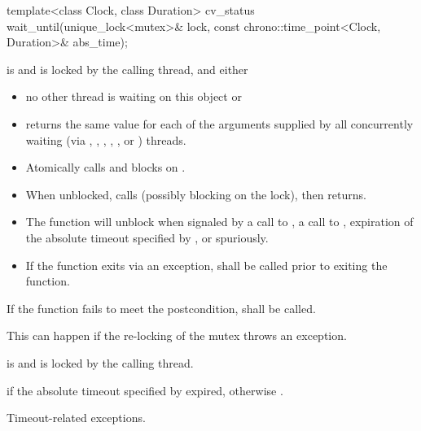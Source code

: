 %
\begin{itemdecl}
template<class Clock, class Duration>
  cv_status wait_until(unique_lock<mutex>& lock,
                       const chrono::time_point<Clock, Duration>& abs_time);
\end{itemdecl}
\begin{itemdescr}
 \pnum \requires {} is  and 
        is locked by the calling thread, and either
        \begin{itemize}
         \item no other thread is waiting on this  object or
         \item {} returns the same value for each of the 
                arguments supplied by all concurrently waiting (via ,
                , ,
                {\color{insertcolor} , , or }) threads.
        \end{itemize}

 \pnum \effects
        \begin{itemize}
         \item Atomically calls  and blocks on .

         \item When unblocked, calls  (possibly blocking on the lock), then returns.

         \item The function will unblock when signaled by a call to , a call to ,
                expiration of the absolute timeout specified by ,
                or spuriously.

         \item If the function exits via an exception,  shall be called prior to exiting the function.
        \end{itemize}

 \pnum \remarks
        If the function fails to meet the postcondition, 
        shall be called.
        \begin{note} This can happen if the re-locking of the mutex throws an exception. \end{note}

 \pnum \postconditions {} is  and 
        is locked by the calling thread.

 \pnum \returns {} if
        the absolute timeout specified by  expired,
        otherwise .

 \pnum\throws Timeout-related exceptions.
\end{itemdescr}

